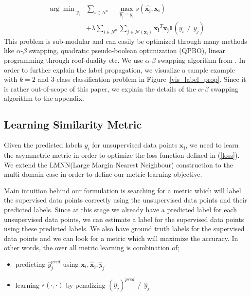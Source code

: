 \begin{equation}
\begin{aligned}
{\arg\min}_{y_i}  &\sum_{i \in N^u} - \max_{\hat{y_j}=y_i}  s(\mathbf{\hat{x_j}},\mathbf{x_{i}}) \\
&+ \lambda
\sum_{i \in N^u} \sum_{j \in \mathcal{N}(\mathbf{x_i})} \mathbf{x_i}^T \mathbf{x_j}\mathds{1}(y_i \neq y_j)
\end{aligned}
\label{robtran}
\end{equation}
This problem is sub-modular and can easily be optimized through many methods like $\alpha$-$\beta$ swapping, quadratic pseudo-boolean optimization (QPBO), linear programming through roof-duality etc. We use $\alpha$-$\beta$ swapping algorithm from \cite{kolmogrovalphabeta}. In order to further explain the label propagation, we visualize a sample example with $k=2$ and $3$-class classification problem in Figure~\ref{vis_label_prop}. Since it is rather out-of-scope of this paper, we explain the details of the $\alpha$-$\beta$ swapping algorithm to the appendix.

\subsection{Learning Similarity Metric}
\label{metric}
Given the predicted labels $y_i$ for unsupervised data points $\mathbf{x_i}$, we need to learn the asymmetric metric in order to optimize the loss function defined in (\ref{loss}). We extend the LMNN(Large Margin Nearest Neighbour)\cite{lmnn} construction to the multi-domain case in order to define our metric learning objective.

Main intuition behind our formulation is searching for a metric which will label the supervised data points correctly using the unsupervised data points and their predicted labels. Since at this stage we already have a predicted label for each unsupervised data points, we can estimate a label for the supervised data points using these predicted labels. We also have ground truth labels for the supervised data points and we can look for a metric which will maximize the accuracy. In other words, the over all metric learning is combination of;

\begin{itemize}
\item predicting $\hat{y}^{pred}_j$ using $\mathbf{x_i}, \mathbf{\hat{x}_j},\hat{y}_j$
\item learning $s(\cdot,\cdot)$ by penalizing  $(\hat{y}_j)^{pred} \neq \hat{y}_j$ 
\end{itemize}

